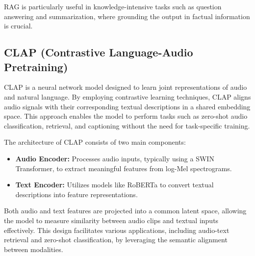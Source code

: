 RAG is particularly useful in knowledge-intensive tasks such as question answering and summarization, where grounding the output in factual information is crucial.


\subsection*{CLAP (Contrastive Language-Audio Pretraining)}

CLAP is a neural network model designed to learn joint representations of audio and natural language. By employing contrastive learning techniques, CLAP aligns audio signals with their corresponding textual descriptions in a shared embedding space. This approach enables the model to perform tasks such as zero-shot audio classification, retrieval, and captioning without the need for task-specific training.

The architecture of CLAP consists of two main components:

\begin{itemize}
    \item \textbf{Audio Encoder:} Processes audio inputs, typically using a SWIN Transformer, to extract meaningful features from log-Mel spectrograms.
    \item \textbf{Text Encoder:} Utilizes models like RoBERTa to convert textual descriptions into feature representations.
\end{itemize}

Both audio and text features are projected into a common latent space, allowing the model to measure similarity between audio clips and textual inputs effectively. This design facilitates various applications, including audio-text retrieval and zero-shot classification, by leveraging the semantic alignment between modalities.
